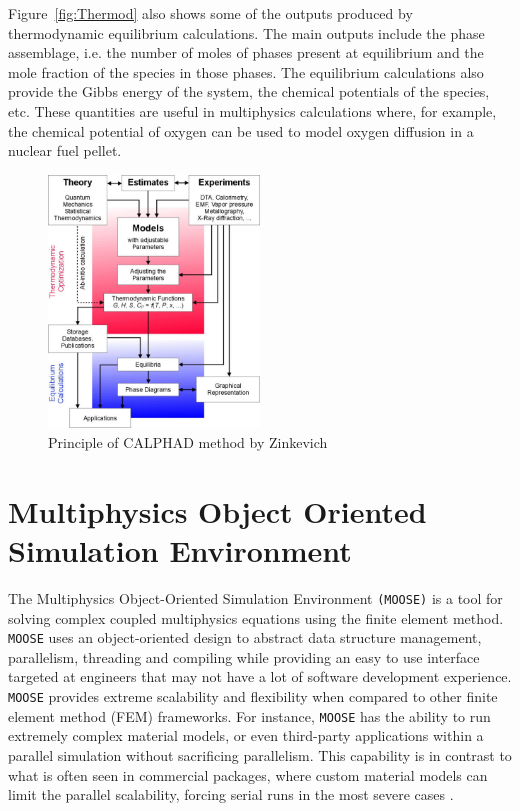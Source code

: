 Figure~\ref{fig:Thermod} also shows some of the outputs produced by thermodynamic equilibrium calculations. The main outputs include the phase assemblage, i.e. the number of moles of phases present at equilibrium and the mole fraction of the species in those phases. The equilibrium calculations also provide the Gibbs energy of the system, the chemical potentials of the species, etc. These quantities are useful in multiphysics calculations where, for example, the chemical potential of oxygen can be used to model oxygen diffusion in a  nuclear fuel pellet.  
	\begin{figure}[htbp]
	\centering
	\includegraphics[width=0.5\textwidth]{figures/Calphad_method}
	\caption{Principle of CALPHAD method by Zinkevich \cite{Zinkevich:2003aa}}
	\label{fig:calphad}
	\end{figure}	

\section{Multiphysics Object Oriented Simulation Environment}
	The  Multiphysics Object-Oriented Simulation Environment \texttt{(MOOSE)} is a tool for solving complex coupled multiphysics equations using the finite element method. \texttt{MOOSE} uses an object-oriented design to abstract data structure management, parallelism, threading and compiling while providing an easy to use interface targeted at engineers that may not have a lot of software development experience. \texttt{MOOSE} provides extreme scalability and flexibility when compared to other finite element method (FEM) frameworks. For instance, \texttt{MOOSE} has the ability to run extremely complex material models, or even third-party applications within a parallel simulation without sacrificing parallelism. This capability is in contrast to what is often seen in commercial packages, where custom material models can limit the parallel scalability, forcing serial runs in the most severe cases \cite{gaston2015physics,moose-web-page}.

